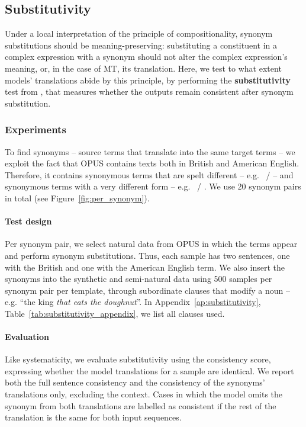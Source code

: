 \subsection{Substitutivity}
\label{subsec:substitutivity}

Under a local interpretation of the principle of compositionality, synonym substitutions should be meaning-preserving: substituting a constituent in a complex expression with a synonym should not alter the complex expression's meaning, or, in the case of MT, its translation.
Here, we test to what extent models' translations abide by this principle, by performing the \textbf{substitutivity} test from \citet{hupkes2020compositionality}, that measures whether the outputs remain consistent after synonym substitution.

\subsubsection{Experiments}
To find synonyms -- source terms that translate into the same target terms -- we exploit the fact that OPUS contains texts both in British and American English.
Therefore, it contains synonymous terms that are spelt different -- e.g.\  /  -- and synonymous terms with a very different form -- e.g.\  / .
We use 20 synonym pairs in total (see Figure~\ref{fig:per_synonym}).

\paragraph{Test design}
Per synonym pair, we select natural data from OPUS in which the terms appear and perform synonym substitutions.
Thus, each sample has two sentences, one with the British and one with the American English term.
We also insert the synonyms into the synthetic and semi-natural data using 500 samples per synonym pair per template, through subordinate clauses that modify a noun -- e.g. ``the king \textit{that eats the doughnut}''.
In Appendix~\ref{ap:substitutivity}, Table~\ref{tab:substitutivity_appendix}, we list all clauses used.

\paragraph{Evaluation}
Like systematicity, we evaluate substitutivity using the consistency score, expressing whether the model translations for a sample are identical.
We report both the full sentence consistency and the consistency of the synonyms' translations only, excluding the context.
Cases in which the model omits the synonym from both translations are labelled as consistent if the rest of the translation is the same for both input sequences.

